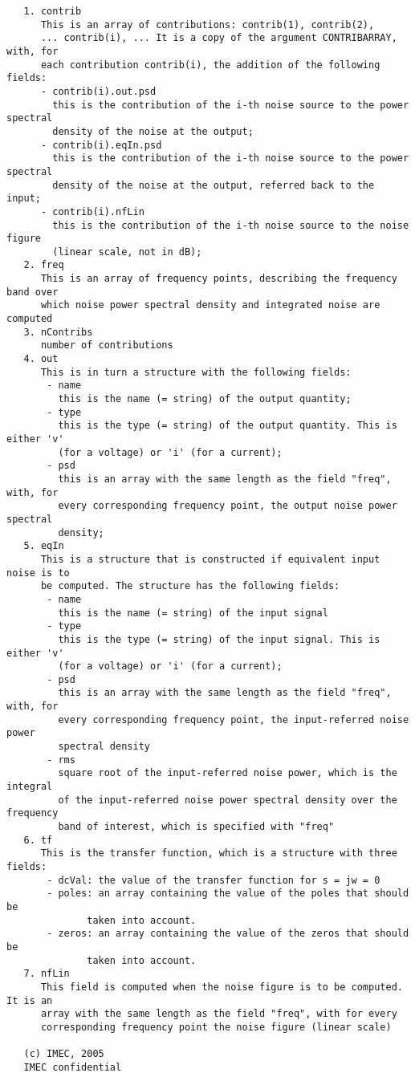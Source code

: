 \begin{verbatim}
   1. contrib
      This is an array of contributions: contrib(1), contrib(2),
      ... contrib(i), ... It is a copy of the argument CONTRIBARRAY, with, for
      each contribution contrib(i), the addition of the following fields: 
      - contrib(i).out.psd
        this is the contribution of the i-th noise source to the power spectral
        density of the noise at the output;
      - contrib(i).eqIn.psd
        this is the contribution of the i-th noise source to the power spectral
        density of the noise at the output, referred back to the input;
      - contrib(i).nfLin
        this is the contribution of the i-th noise source to the noise figure
        (linear scale, not in dB);
   2. freq
      This is an array of frequency points, describing the frequency band over
      which noise power spectral density and integrated noise are computed
   3. nContribs
      number of contributions
   4. out
      This is in turn a structure with the following fields:
       - name
         this is the name (= string) of the output quantity;
       - type
         this is the type (= string) of the output quantity. This is either 'v'
         (for a voltage) or 'i' (for a current);
       - psd
         this is an array with the same length as the field "freq", with, for
         every corresponding frequency point, the output noise power spectral
         density;
   5. eqIn
      This is a structure that is constructed if equivalent input noise is to
      be computed. The structure has the following fields:
       - name
         this is the name (= string) of the input signal
       - type
         this is the type (= string) of the input signal. This is either 'v'
         (for a voltage) or 'i' (for a current);
       - psd
         this is an array with the same length as the field "freq", with, for
         every corresponding frequency point, the input-referred noise power
         spectral density
       - rms
         square root of the input-referred noise power, which is the integral
         of the input-referred noise power spectral density over the frequency
         band of interest, which is specified with "freq"
   6. tf
      This is the transfer function, which is a structure with three fields:
       - dcVal: the value of the transfer function for s = jw = 0
       - poles: an array containing the value of the poles that should be
              taken into account.
       - zeros: an array containing the value of the zeros that should be
              taken into account.
   7. nfLin
      This field is computed when the noise figure is to be computed. It is an
      array with the same length as the field "freq", with for every
      corresponding frequency point the noise figure (linear scale)
 
   (c) IMEC, 2005
   IMEC confidential 
 

\end{verbatim}

